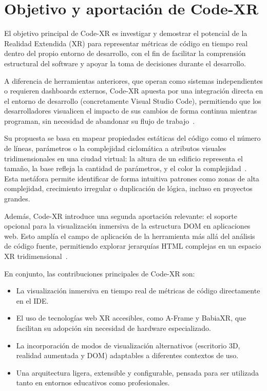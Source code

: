 \documentclass[a4paper, 12pt]{book}
\begin{document}
\section{Objetivo y aportación de Code-XR}
\label{sec:objetivo}

El objetivo principal de Code-XR es investigar y demostrar el potencial de la Realidad Extendida (XR) para representar métricas de código en tiempo real dentro del propio entorno de desarrollo, con el fin de facilitar la comprensión estructural del software y apoyar la toma de decisiones durante el desarrollo.

A diferencia de herramientas anteriores, que operan como sistemas independientes o requieren dashboards externos, Code-XR apuesta por una integración directa en el entorno de desarrollo (concretamente Visual Studio Code), permitiendo que los desarrolladores visualicen el impacto de sus cambios de forma continua mientras programan, sin necesidad de abandonar su flujo de trabajo~\cite{wettel2007visualizing, fittkau2015exploring}.

Su propuesta se basa en mapear propiedades estáticas del código como el número de líneas, parámetros o la complejidad ciclomática a atributos visuales tridimensionales en una ciudad virtual: la altura de un edificio representa el tamaño, la base refleja la cantidad de parámetros, y el color la complejidad~\cite{wettel2007visualizing}. Esta metáfora permite identificar de forma intuitiva patrones como zonas de alta complejidad, crecimiento irregular o duplicación de lógica, incluso en proyectos grandes.

Además, Code-XR introduce una segunda aportación relevante: el soporte opcional para la visualización inmersiva de la estructura DOM en aplicaciones web. Esto amplía el campo de aplicación de la herramienta más allá del análisis de código fuente, permitiendo explorar jerarquías HTML complejas en un espacio XR tridimensional~\cite{moreno2024enhancing}.

En conjunto, las contribuciones principales de Code-XR son:

\begin{itemize}
    \item La visualización inmersiva en tiempo real de métricas de código directamente en el IDE.
    \item El uso de tecnologías web XR accesibles, como A-Frame y BabiaXR, que facilitan su adopción sin necesidad de hardware especializado.
    \item La incorporación de modos de visualización alternativos (escritorio 3D, realidad aumentada y DOM) adaptables a diferentes contextos de uso.
    \item Una arquitectura ligera, extensible y configurable, pensada para ser utilizada tanto en entornos educativos como profesionales.
\end{itemize}
\end{document}
